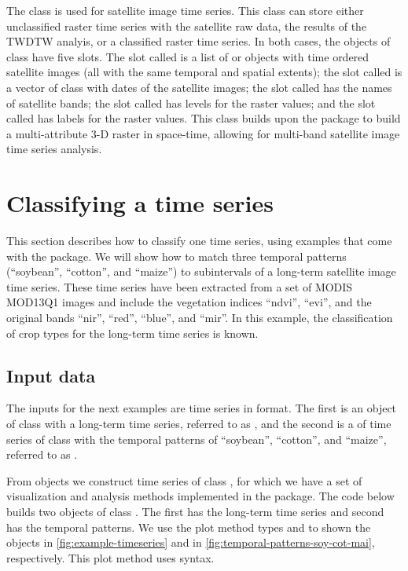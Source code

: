 \documentclass[article,shortnames]{jss}
\begin{document}
The class  is used for satellite image time series.
This class can store either unclassified raster time series with the
satellite raw data, the results of the TWDTW analyis, or a classified
raster time series. In both cases, the objects of class
 have five slots. The slot called  is
a list of  or  objects with time
ordered satellite images (all with the same temporal and spatial
extents); the slot called  is a vector of class
 with dates of the satellite images; the slot called
 has the names of satellite bands; the slot called
 has levels for the raster values; and the slot called
 has labels for the raster values. This class builds upon
the  package  to build a multi-attribute 3-D
raster in space-time, allowing for multi-band satellite image time
series analysis.

\section{Classifying a time series}\label{classifying-a-time-series}

This section describes how to classify one time series, using examples
that come with the  package. We will show how to match three
temporal patterns (``soybean'', ``cotton'', and ``maize'') to
subintervals of a long-term satellite image time series. These time
series have been extracted from a set of MODIS MOD13Q1
\citep{Friedl:2010} images and include the vegetation indices ``ndvi'',
``evi'', and the original bands ``nir'', ``red'', ``blue'', and ``mir''.
In this example, the classification of crop types for the long-term time
series is known.

\subsection{Input data}\label{input-data}

The inputs for the next examples are time series in  format.
The first is an object of class  with a long-term time series,
referred to as , and the second is a  of
time series of class  with the temporal patterns of
``soybean'', ``cotton'', and ``maize'', referred to as
.

From  objects we construct time series of class
, for which we have a set of visualization and
analysis methods implemented in the  package. The code below
builds two objects of class . The first has the
long-term time series and second has the temporal patterns. We use the
plot method types  and  to shown the
objects  in \autoref{fig:example-timeseries} and
 in \autoref{fig:temporal-patterns-soy-cot-mai},
respectively. This plot method uses  syntax.
\end{document}
